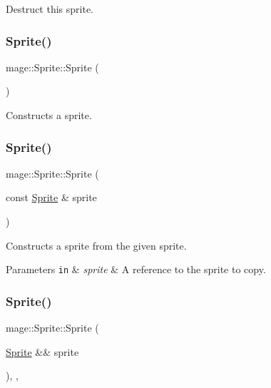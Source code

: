 Destruct this sprite. \hypertarget{classmage_1_1_sprite_af04ff53dcfcc4aa5001368882c911cf7}{}\label{classmage_1_1_sprite_af04ff53dcfcc4aa5001368882c911cf7} 
\subsubsection{\texorpdfstring{Sprite()}{Sprite()}\hspace{0.1cm}{\footnotesize\ttfamily [1/3]}}
{\footnotesize\ttfamily mage\+::\+Sprite\+::\+Sprite (\begin{DoxyParamCaption}{ }\end{DoxyParamCaption})\hspace{0.3cm}{\ttfamily [protected]}}

Constructs a sprite. \hypertarget{classmage_1_1_sprite_a9c1eb4f5a85e1fa17479012dd22114a9}{}\label{classmage_1_1_sprite_a9c1eb4f5a85e1fa17479012dd22114a9} 
\subsubsection{\texorpdfstring{Sprite()}{Sprite()}\hspace{0.1cm}{\footnotesize\ttfamily [2/3]}}
{\footnotesize\ttfamily mage\+::\+Sprite\+::\+Sprite (\begin{DoxyParamCaption}\item[{const \hyperlink{classmage_1_1_sprite}{Sprite} \&}]{sprite }\end{DoxyParamCaption})\hspace{0.3cm}{\ttfamily [protected]}}

Constructs a sprite from the given sprite.


\begin{DoxyParams}[1]{Parameters}
\mbox{\tt in}  & {\em sprite} & A reference to the sprite to copy. \\
\hline
\end{DoxyParams}
\hypertarget{classmage_1_1_sprite_a99bc5627bf389bb43e4b84375bc22fdc}{}\label{classmage_1_1_sprite_a99bc5627bf389bb43e4b84375bc22fdc} 
\subsubsection{\texorpdfstring{Sprite()}{Sprite()}\hspace{0.1cm}{\footnotesize\ttfamily [3/3]}}
{\footnotesize\ttfamily mage\+::\+Sprite\+::\+Sprite (\begin{DoxyParamCaption}\item[{\hyperlink{classmage_1_1_sprite}{Sprite} \&\&}]{sprite }\end{DoxyParamCaption})\hspace{0.3cm}{\ttfamily [protected]}, {\ttfamily [default]}, {\ttfamily [noexcept]}}


